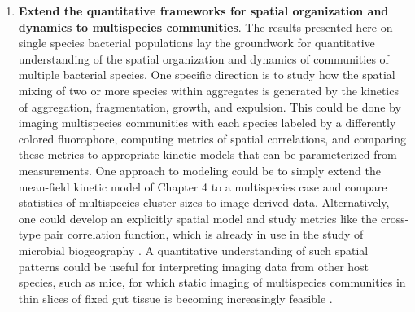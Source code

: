 \begin{enumerate}
\item 
\textbf{Extend the quantitative frameworks for spatial organization and dynamics to multispecies communities}. The results presented here on single species bacterial populations lay the groundwork for quantitative understanding of the spatial organization and dynamics of communities of multiple bacterial species. One specific direction is to study how the spatial mixing of two or more species within aggregates is generated by the kinetics of aggregation, fragmentation, growth, and expulsion. This could be done by imaging multispecies communities with each species labeled by a differently colored fluorophore, computing metrics of spatial correlations, and comparing these metrics to appropriate kinetic models that can be parameterized from measurements. One approach to modeling could be to simply extend the mean-field kinetic model of Chapter 4 \cite{schlomann_sublethal_2019} to a multispecies case and compare statistics of multispecies cluster sizes to image-derived data. Alternatively, one could develop an explicitly spatial model and study metrics like the cross-type pair correlation function, which is already in use in the study of microbial biogeography \cite{welch_spatial_2017}. A quantitative understanding of such spatial patterns could be useful for interpreting imaging data from other host species, such as mice, for which static imaging of multispecies communities in thin slices of fixed gut tissue is becoming increasingly feasible \cite{welch_spatial_2017}. 


\end{enumerate}
